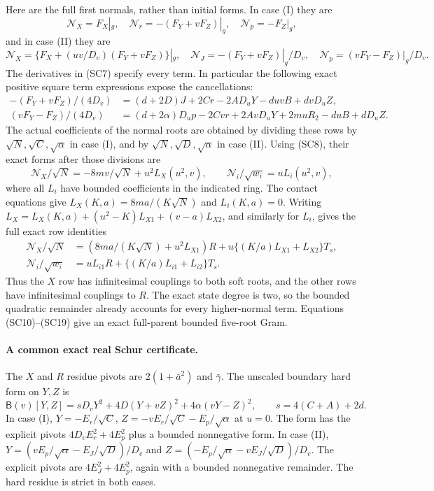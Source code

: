 Here are the full first normals, rather than initial forms. In
case (I) they are
\[
 \mathcal N_X=F_X|_g,\quad
 \mathcal N_r=-(F_Y+vF_Z)|_g,\quad
 \mathcal N_p=-F_Z|_g,                              \tag{SC15}
\]
and in case (II) they are
\[
 \mathcal N_X=\{F_X+(uv/D_v)(F_Y+vF_Z)\}|_g,\quad
 \mathcal N_J=-(F_Y+vF_Z)|_g/D_v,\quad
 \mathcal N_p=(vF_Y-F_Z)|_g/D_v.                     \tag{SC16}
\]
The derivatives in (SC7) specify every term. In particular the
following exact positive square term expressions expose the cancellations:
\[
\begin{split}
 -(F_Y+vF_Z)/(4D_v)
   &=(d+2D)J+2Cr-2AD_uY-duvB+dvD_uZ,\\
 (vF_Y-F_Z)/(4D_v)
   &=(d+2\alpha)D_up-2Cvr+2AvD_uY+2muR_2-duB+dD_uZ.
\end{split}\tag{SC17}
\]
The actual coefficients of the normal roots are obtained by dividing
these rows by $\sqrt N,\sqrt C,\sqrt\alpha$ in case (I), and by
$\sqrt N,\sqrt D,\sqrt\alpha$ in case (II).
Using (SC8), their exact forms after those divisions are
\[
 \mathcal N_X/\sqrt N=-8mv/\sqrt N+u^2L_X(u^2,v),
 \qquad \mathcal N_i/\sqrt{w_i}=uL_i(u^2,v),          \tag{SC18}
\]
where all $L_i$ have bounded coefficients in the indicated ring.
The contact equations give
$L_X(K,a)=8ma/(K\sqrt N)$ and $L_i(K,a)=0$.
Writing $L_X=L_X(K,a)+(u^2-K)L_{X1}+(v-a)L_{X2}$, and similarly
for $L_i$, gives the full exact row identities
\[
\begin{split}
 \mathcal N_X/\sqrt N
  &=(8ma/(K\sqrt N)+u^2L_{X1})R
       +u\{(K/a)L_{X1}+L_{X2}\}T_s,\\
 \mathcal N_i/\sqrt{w_i}
  &=uL_{i1}R+\{(K/a)L_{i1}+L_{i2}\}T_s.             
\end{split}\tag{SC19}
\]
Thus the $X$ row has infinitesimal couplings to both soft roots,
and the other rows have infinitesimal couplings to $R$.
The exact state degree is two, so the bounded quadratic remainder
already accounts for every higher-normal term. Equations
(SC10)--(SC19) give an exact full-parent bounded five-root Gram.

\paragraph{A common exact real Schur certificate.}
The $X$ and $R$ residue pivots are $2(1+\bar a^2)$ and
$\bar\gamma$. The unscaled boundary hard form on $Y,Z$ is
\[
 \mathsf B(v)[Y,Z]
 =sD_vY^2+4D(Y+vZ)^2+4\alpha(vY-Z)^2,
 \qquad s=4(C+A)+2d.                               \tag{SC20}
\]
In case (I), $Y=-E_r/\sqrt C$,
$Z=-vE_r/\sqrt C-E_p/\sqrt\alpha$ at $u=0$.
The form has the explicit pivots $4D_vE_r^2+4E_p^2$ plus a
bounded nonnegative form. In case (II),
$Y=(vE_p/\sqrt\alpha-E_J/\sqrt D)/D_v$ and
$Z=(-E_p/\sqrt\alpha-vE_J/\sqrt D)/D_v$.
The explicit pivots are $4E_J^2+4E_p^2$, again with a bounded
nonnegative remainder. The hard residue is strict in both cases.


